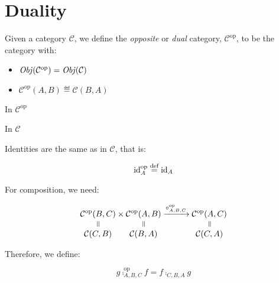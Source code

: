 \section{Duality}
\begin{definition}[Duality]
Given a category $\mathcal{C}$, we define the \emph{opposite} or \emph{dual}
category, $\mathcal{C}^{\mathrm{op}}$, to be the category with:
    \begin{itemize}
        \item $\operatorname{\mathit{Obj}}(\mathcal{C}^{\mathrm{op}}) = \operatorname{\mathit{Obj}}(\mathcal{C})$
        \item $\mathcal{C}^{\mathrm{op}}(A, B) \eqdef \mathcal{C}(B, A)$
    \end{itemize}

\begin{minipage}[t]{0.49\textwidth}
    \begin{center}
        In $\mathcal{C}^{\mathrm{op}}$

        \vspace{15pt}

    \end{center}
\end{minipage}%
\vline%
\begin{minipage}[t]{0.49\textwidth}
    \begin{center}
        In $\mathcal{C}$

        \vspace{15pt}

    \end{center}
\end{minipage}

Identities are the same as in $\mathcal{C}$, that is:

\begin{equation*}
    \mathrm{id}_{ A }^{\mathrm{op}} \stackrel{\text{def}}{=} \mathrm{id}_{ A }
\end{equation*}

For composition, we need:

\begin{equation*}
    \equalto{\mathcal{C}^{\mathrm{op}}(B, C)}{\mathcal{C}(C, B)} \times
    \equalto{\mathcal{C}^{\mathrm{op}}(A, B)}{\mathcal{C}(B, A)}
    \xrightarrow{\comp^{\mathrm{op}}_{A,B,C}}
    \equalto{\mathcal{C}^{\mathrm{op}}(A, C)}{\mathcal{C}(C, A)}
\end{equation*}

Therefore, we define:

\begin{equation*}
    g \comp^{\mathrm{op}}_{A,B,C} f = f \comp_{C,B,A} g
\end{equation*}
\end{definition}

